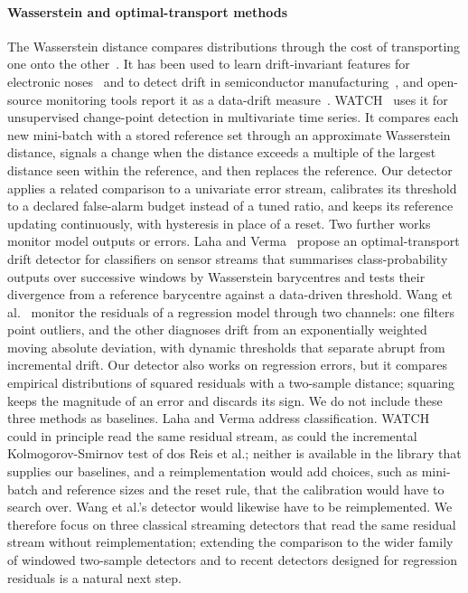 \documentclass[preprint,12pt]{elsarticle}
\begin{document}
\paragraph{Wasserstein and optimal-transport methods} The Wasserstein distance compares distributions through the cost of transporting one onto the other~\cite{villani2008}. It has been used to learn drift-invariant features for electronic noses~\cite{tao2019} and to detect drift in semiconductor manufacturing~\cite{lin2025}, and open-source monitoring tools report it as a data-drift measure~\cite{muller2024}. WATCH~\cite{faber2021watch} uses it for unsupervised change-point detection in multivariate time series. It compares each new mini-batch with a stored reference set through an approximate Wasserstein distance, signals a change when the distance exceeds a multiple of the largest distance seen within the reference, and then replaces the reference. Our detector applies a related comparison to a univariate error stream, calibrates its threshold to a declared false-alarm budget instead of a tuned ratio, and keeps its reference updating continuously, with hysteresis in place of a reset. Two further works monitor model outputs or errors. Laha and Verma~\cite{laha2021optimal} propose an optimal-transport drift detector for classifiers on sensor streams that summarises class-probability outputs over successive windows by Wasserstein barycentres and tests their divergence from a reference barycentre against a data-driven threshold. Wang et al.~\cite{wang2026dualchannel} monitor the residuals of a regression model through two channels: one filters point outliers, and the other diagnoses drift from an exponentially weighted moving absolute deviation, with dynamic thresholds that separate abrupt from incremental drift. Our detector also works on regression errors, but it compares empirical distributions of squared residuals with a two-sample distance; squaring keeps the magnitude of an error and discards its sign. We do not include these three methods as baselines. Laha and Verma address classification. WATCH could in principle read the same residual stream, as could the incremental Kolmogorov-Smirnov test of dos Reis et al.; neither is available in the library that supplies our baselines, and a reimplementation would add choices, such as mini-batch and reference sizes and the reset rule, that the calibration would have to search over. Wang et al.'s detector would likewise have to be reimplemented. We therefore focus on three classical streaming detectors that read the same residual stream without reimplementation; extending the comparison to the wider family of windowed two-sample detectors and to recent detectors designed for regression residuals is a natural next step.
\end{document}
